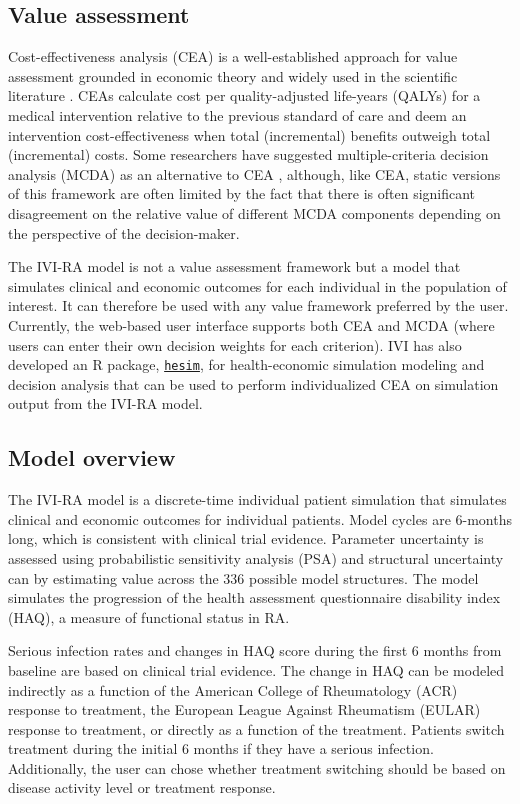 \documentclass[11pt,final,fleqn]{article}\usepackage[]{graphicx}\usepackage[]{color}
\theoremstyle{plain}
\newcommand{\code}[1]{\texttt{#1}}
\begin{document}
\subsection*{Value assessment}
Cost-effectiveness analysis (CEA) is a well-established approach for value assessment grounded in economic theory and widely used in the scientific literature \citep{briggs2006decision, meltzer2011theoretical, drummond2015methods}. CEAs calculate cost per quality-adjusted life-years (QALYs) for a medical intervention relative to the previous standard of care and deem an intervention cost-effectiveness when total (incremental) benefits outweigh total (incremental) costs. Some researchers have suggested multiple-criteria decision analysis (MCDA) as an alternative to CEA \citep{thokala2012multiple}, although, like CEA, static versions of this framework are often limited by the fact that there is often significant disagreement on the relative value of different MCDA components depending on the perspective of the decision-maker. 

The IVI-RA model is not a value assessment framework but a model that simulates clinical and economic outcomes for each individual in the population of interest. It can therefore be used with any value framework preferred by the user. Currently, the web-based user interface supports both CEA and MCDA (where users can enter their own decision weights for each criterion). IVI has also developed an R package, \code{\href{https://innovationvalueinitiative.github.io/hesim/}{hesim}}, for health-economic simulation modeling and decision analysis that can be used to perform individualized CEA \citep{basu2007value, ioannidis2011individualized, espinoza2014value} on simulation output from the IVI-RA model. 

\subsection*{Model overview}
The IVI-RA model is a discrete-time individual patient simulation that simulates clinical and economic outcomes for individual patients. Model cycles are 6-months long, which is consistent with clinical trial evidence. Parameter uncertainty is assessed using probabilistic sensitivity analysis (PSA) and structural uncertainty can by estimating value across the 336 possible model structures. The model simulates the progression of the health assessment questionnaire disability index (HAQ), a measure of functional status in RA. 

Serious infection rates and changes in HAQ score during the first 6 months from baseline are based on clinical trial evidence. The change in HAQ can be modeled indirectly as a function of the American College of Rheumatology (ACR) response to treatment, the European League Against Rheumatism (EULAR) response to treatment, or directly as a function of the treatment. Patients switch treatment during the initial 6 months if they have a serious infection. Additionally, the user can chose whether treatment switching should be based on disease activity level or treatment response. 
\end{document}
